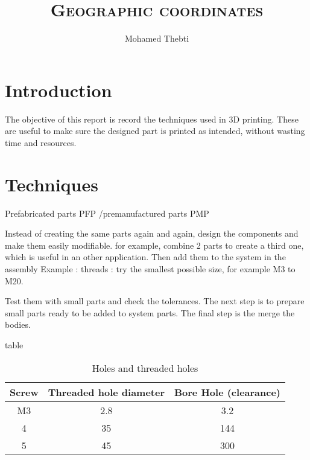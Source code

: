 \documentclass[12pt,a4paper]{article}
\title{
	\Huge\textsc{Geographic coordinates}
}
\author{Mohamed Thebti}
\begin{document}
\setlength{\parindent}{0mm}

\fancyhead[R]{\slshape \leftmark}

\fancyfoot[C]{}
\fancyfoot[R]{\thepage}

\maketitle
\newpage

\tableofcontents

\newpage



\section{Introduction}

The objective of this report is record the techniques used in 3D printing. These are useful to make sure the designed part is printed as intended, without wasting time and resources. 



\newpage
\section{Techniques}
Prefabricated parts PFP /premanufactured parts PMP

Instead of creating the same parts again and again, design the components and make them easily modifiable.
for example, combine 2 parts to create a third one, which is useful in an other application. Then add them to the system in the assembly
Example : threads : try the smallest possible size, for example M3 to M20. 

Test them with small parts and check the tolerances. 
The next step is to prepare small parts ready to be added to system parts. The final step is the merge the bodies. 


table

\begin{table}[ht]
	\caption{Holes and threaded holes} %
	\centering %
	\begin{tabular}{c c c} %
		\hline\hline %
		Screw & Threaded hole diameter & Bore Hole (clearance) \\ [0.5ex] %
		\hline %
		M3 & 2.8 & 3.2 \\ %
		4 & 35 & 144 \\
		5 & 45 & 300 \\ [1ex] %
		\hline %
	\end{tabular}\label{table:nonlin} %
\end{table}
\end{document}
